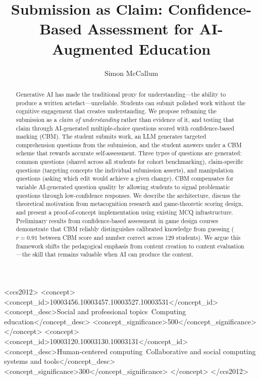 \documentclass[sigconf]{acmart}
\begin{document}
\title{Submission as Claim: Confidence-Based Assessment for AI-Augmented Education}

\author{Simon McCallum}

\begin{abstract}
Generative AI has made the traditional proxy for understanding---the ability to produce a written artefact---unreliable. Students can submit polished work without the cognitive engagement that creates understanding. We propose reframing the submission as a \emph{claim of understanding} rather than evidence of it, and testing that claim through AI-generated multiple-choice questions scored with confidence-based marking (CBM). The student submits work, an LLM generates targeted comprehension questions from the submission, and the student answers under a CBM scheme that rewards accurate self-assessment. Three types of questions are generated: common questions (shared across all students for cohort benchmarking), claim-specific questions (targeting concepts the individual submission asserts), and manipulation questions (asking which edit would achieve a given change). CBM compensates for variable AI-generated question quality by allowing students to signal problematic questions through low-confidence responses. We describe the architecture, discuss the theoretical motivation from metacognition research and game-theoretic scoring design, and present a proof-of-concept implementation using existing MCQ infrastructure. Preliminary results from confidence-based assessment in game design courses demonstrate that CBM reliably distinguishes calibrated knowledge from guessing ($r = 0.91$ between CBM score and number correct across 129 students). We argue this framework shifts the pedagogical emphasis from content creation to content evaluation---the skill that remains valuable when AI can produce the content.
\end{abstract}

\begin{CCSXML}
<ccs2012>
<concept>
<concept_id>10003456.10003457.10003527.10003531</concept_id>
<concept_desc>Social and professional topics~Computing education</concept_desc>
<concept_significance>500</concept_significance>
</concept>
<concept>
<concept_id>10003120.10003130.10003131</concept_id>
<concept_desc>Human-centered computing~Collaborative and social computing systems and tools</concept_desc>
<concept_significance>300</concept_significance>
</concept>
</ccs2012>
\end{CCSXML}
\end{document}
